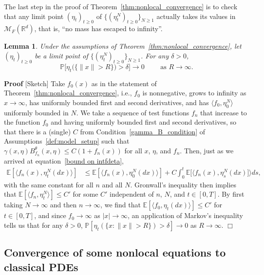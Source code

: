 \documentclass[12pt]{article}
\newenvironment {proof}{{\noindent\bf Proof }}{\hfill $\Box$ \medskip}
\newtheorem{lemma}[theorem]{Lemma}
\newcommand{\IP}{\mathbb P}
\newcommand{\IE}{\mathbb E}
\newcommand{\IR}{\mathbb R}
\newcommand{\measures}{\mathcal{M}_F(\IR^d)} %
\numberwithin{equation}{section}
\begin{document}
The last step in the proof of Theorem~\ref{thm:nonlocal_convergence}
is to check that
any limit point $(\eta_t)_{t\geq 0}$ of $\{(\eta^N_t)_{t\geq 0}\}_{N\geq 1}$
actually takes its values in $\measures$, that is, ``no mass has escaped to infinity''.

\begin{lemma}
\label{no mass at infty}
Under the assumptions of Theorem~\ref{thm:nonlocal_convergence},
let $(\eta_t)_{t\geq 0}$ be a limit point of $\{(\eta^N_t)_{t\geq 0}\}_{N\geq 1}$. 
For any $\delta>0$, 
\[
\IP\big[\eta_t\big(\{\|x\|>R\}\big)>\delta\big]\to 0\qquad\mbox{ as }R\to\infty.
\]
\end{lemma}

\begin{proof}[Sketch]
Take $f_0(x)$ as in the statement of Theorem~\ref{thm:nonlocal_convergence},
i.e., $f_0$ is nonnegative, grows to infinity as $x \to \infty$,
has uniformly bounded first and second derivatives,
and has $\langle f_0, \eta^N_0\rangle$ uniformly bounded in $N$.
We take a sequence of test functions $f_n$ that increase to the function $f_0$
and having uniformly bounded first and second derivatives,
so that there is a (single) $C$
from Condition~\ref{gamma_B_condition} of Assumptions~\ref{def:model_setup}
such that $\gamma(x,\eta) B_{f_n}^\theta(x,\eta) \le C(1 + f_n(x))$
for all $x$, $\eta$, and $f_n$.
Then, just as we arrived at equation~\eqref{bound on intfdeta},
\begin{align*}
    \IE[\langle f_n(x), \eta^N_t(dx) \rangle]
    &\le
    \IE[\langle f_n(x), \eta^N_0(dx) \rangle]
    +
    C \int_0^t \IE\Big[\Big\langle f_n(x), \eta^N_s(dx) \Big] \Big\rangle ds ,
\end{align*}
with the same constant for all $n$ and all $N$.
Gronwall's inequality then implies that 
$\IE[\langle f_n, \eta^N_t\rangle] \le C'$
for some $C'$ independent of $n$, $N$, and $t \in [0,T]$.
By first taking $N \to \infty$ and then $n \to \infty$,
we find that $\IE[\langle f_0, \eta_t(dx)\rangle] \le C'$
for $t\in [0,T]$, and since $f_0 \to \infty$ as $|x| \to \infty$,
an application of Markov's inequality
tells us that for any $\delta > 0$,
$\IP[\eta_t(\{x : \|x\| > R\})>\delta]\to 0$ as $R\to\infty$.
\end{proof}

\subsection{Convergence of some nonlocal equations to classical PDEs}
\label{subsec:nonlocal to local}
\end{document}
